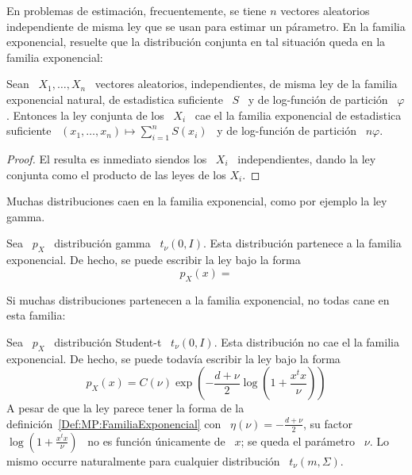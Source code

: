 En problemas  de estimaci\'on, frecuentemente, se tiene  $n$ vectores aleatorios
independiente  de misma  ley que  se  usan para  estimar un  p\'arametro. En  la
familia exponencial, resuelte que  la distribuci\'on conjunta en tal situaci\'on
queda en la familia exponencial:
%
\begin{lema}
  Sean \  $X_1 , \ldots ,  X_n$ \ vectores aleatorios,  independientes, de misma
  ley de la familia exponencial natural,  de estadistica suficiente \ $S$ \ y de
  log-funci\'on de  partici\'on \ $\varphi$. Entonces  la ley conjunta  de los \
  $X_i$  \   cae  el  la   familia  exponencial  de  estadistica   suficiente  \
  $\displaystyle   (x_1,\ldots,x_n)  \mapsto   \sum_{i=1}^n  S(x_i)$   \   y  de
  log-funci\'on de partici\'on \ $n \varphi$.
\end{lema}
%
\begin{proof}
  El resulta  es inmediato siendos  los \ $X_i$  \ independientes, dando  la ley
  conjunta como el producto de las leyes de los $X_i$.
\end{proof}


Muchas distribuciones  caen en la familia  exponencial, como por  ejemplo la ley
gamma.
%
\begin{ejemplo}
  Sea  \  $p_X$  \  distribuci\'on  gamma \  $t_\nu(0,I)$.  Esta  distribuci\'on
  partenece a la familia exponencial. De hecho, se puede escribir la ley bajo la
  forma
  \[
p_X(x) = 
  \]
\end{ejemplo}

Si muchas distribuciones  partenecen a la familia exponencial,  no todas cane en
esta familia:
%
\begin{ejemplo}
  Sea \ $p_X$ \ distribuci\'on  Student-t \ $t_\nu(0,I)$. Esta distribuci\'on no
  cae el  la familia exponencial. De  hecho, se puede todav\'ia  escribir la ley
  bajo la forma
  \[
  p_X(x) = C(\nu) \exp\left( - \frac{d+\nu}{2} \log\left( 1 + \frac{x^t x}{\nu} \right) \right)
  \]
  A    pesar   de    que    la   ley    parece    tener   la    forma   de    la
  definici\'on~\ref{Def:MP:FamiliaExponencial}    con   \    $\eta(\nu)    =   -
  \frac{d+\nu}{2}$, su factor \ $\log\left(  1 + \frac{x^t x}{\nu} \right)$ \ no
  es funci\'on \'unicamente de \ $x$; se queda el par\'ametro \ $\nu$.  Lo mismo
  occurre naturalmente para cualquier distribuci\'on \ $t_\nu(m,\Sigma)$.
\end{ejemplo}

